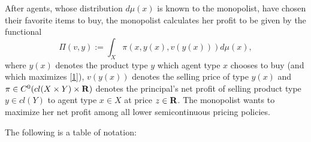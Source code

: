 After agents, whose distribution $d \mu(x)$ is known to the monopolist, have chosen their favorite items to buy, the monopolist calculates her profit to be given by the functional 
\begin{equation}\label{profit}
\Pi(v, y):=\int_{X} \pi(x,y(x),v(y(x))) d\mu(x),
\end{equation}
where $y(x)$ denotes the product type $y$ which agent type $x$ chooses to buy (and which maximizes \eqref{1}), $v(y(x))$ denotes the selling price of type $y(x)$ and $\pi \in C^0(cl(X\times Y)\times {\mathbf R})$ denotes the principal's net profit of selling product type $y \in cl(Y)$ to agent type $x \in X$ at price $z \in {\mathbf R}$. 
The monopolist wants to maximize her net profit among all lower semicontinuous pricing policies. \medskip




The following is a table of notation:

